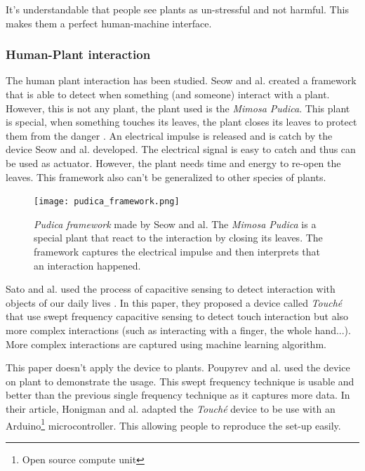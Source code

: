 It's understandable that people see plants as un-stressful and not harmful. This makes them a perfect human-machine interface.

\subsubsection{Human-Plant interaction}

The human plant interaction has been studied. Seow and al. \cite{seowPudicaFrameworkDesigning2022}
created a framework that is able to detect when something (and someone) interact with a plant.
However, this is not any plant, the plant used is the \textit{Mimosa Pudica}. This plant is special,
when something touches its leaves, the plant closes its leaves to protect them from the danger \cite{volkovMimosaPudicaElectrical2010}. 
An electrical impulse is released and is catch by the device Seow and al. developed. The electrical 
signal is easy to catch and thus can be used as actuator. However, the plant needs time and energy
to re-open the leaves. This framework also can't be generalized to other species of plants.

\begin{figure}[h!]
    \centering
    \texttt{[image: pudica\_framework.png]}
    \caption{\textit{Pudica framework} made by Seow and al. The \textit{Mimosa Pudica} is a
    special plant that react to the interaction by closing its leaves. The framework
    captures the electrical impulse and then interprets that an interaction happened.} 
    \vspace{0.1cm}
    \label{fig:pudica_framework}
\end{figure}

Sato and al. used the process of capacitive sensing to detect interaction with objects of our daily lives \cite{satoToucheEnhancingTouch2012}.
In this paper, they proposed a device called \textit{Touché} that use swept frequency capacitive sensing  to detect touch interaction 
but also more complex interactions (such as interacting with a finger, the whole hand...). More complex 
interactions are captured using machine learning algorithm.

This paper doesn't apply the device to plants. Poupyrev and al. \cite{poupyrevBotanicusInteracticusInteractive2012}
used the device on plant to demonstrate the usage. This swept frequency technique is usable and better
than the previous single frequency technique as it captures more data.
In their article, Honigman and al. \cite{honigmanTechniquesSweptFrequencyb} adapted the \textit{Touché}
device to be use with an Arduino\footnote{Open source compute unit} microcontroller. This allowing people
to reproduce the set-up easily.


